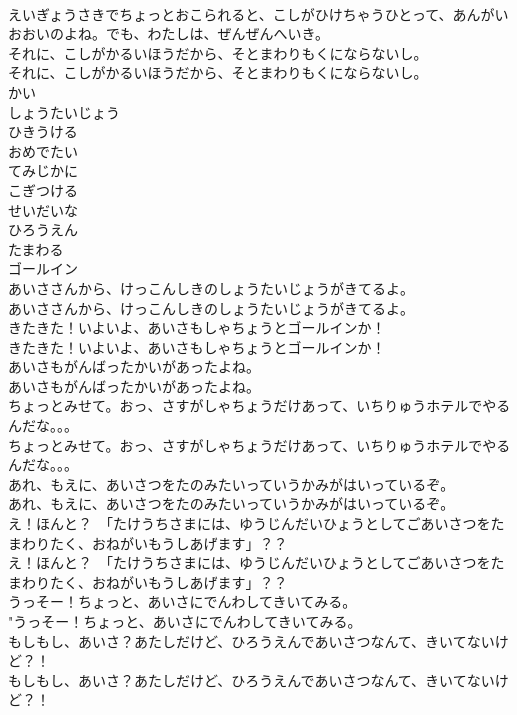 \documentclass[8pt]{extreport}
\begin{document}
\begin{CJK}{UTF8}{min}
\\	えいぎょうさきでちょっとおこられると、こしがひけちゃうひとって、あんがいおおいのよね。でも、わたしは、ぜんぜんへいき。 
\\	それに、こしがかるいほうだから、そとまわりもくにならないし。	
\\	それに、こしがかるいほうだから、そとまわりもくにならないし。 
\\	かい
\\	しょうたいじょう
\\	ひきうける
\\	おめでたい
\\	てみじかに
\\	こぎつける
\\	せいだいな
\\	ひろうえん
\\	たまわる
\\	ゴールイン
\\	あいささんから、けっこんしきのしょうたいじょうがきてるよ。	
\\	あいささんから、けっこんしきのしょうたいじょうがきてるよ。 
\\	きたきた！いよいよ、あいさもしゃちょうとゴールインか！	
\\	きたきた！いよいよ、あいさもしゃちょうとゴールインか！ 
\\	あいさもがんばったかいがあったよね。	
\\	あいさもがんばったかいがあったよね。 
\\	ちょっとみせて。おっ、さすがしゃちょうだけあって、いちりゅうホテルでやるんだな。。。	
\\	ちょっとみせて。おっ、さすがしゃちょうだけあって、いちりゅうホテルでやるんだな。。。 
\\	あれ、もえに、あいさつをたのみたいっていうかみがはいっているぞ。	
\\	あれ、もえに、あいさつをたのみたいっていうかみがはいっているぞ。 
\\	え！ほんと？　「たけうちさまには、ゆうじんだいひょうとしてごあいさつをたまわりたく、おねがいもうしあげます」？？	
\\	え！ほんと？　「たけうちさまには、ゆうじんだいひょうとしてごあいさつをたまわりたく、おねがいもうしあげます」？？ 
\\	うっそー！ちょっと、あいさにでんわしてきいてみる。	
\\	"うっそー！ちょっと、あいさにでんわしてきいてみる。 
\\	もしもし、あいさ？あたしだけど、ひろうえんであいさつなんて、きいてないけど？！	
\\	もしもし、あいさ？あたしだけど、ひろうえんであいさつなんて、きいてないけど？！ 

\end{CJK}
\end{document}
